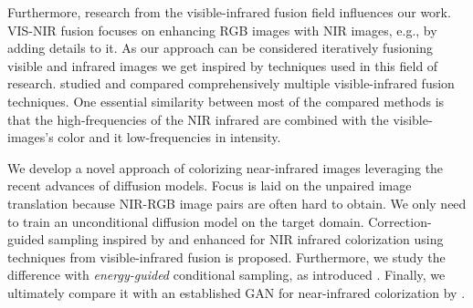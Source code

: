 Furthermore, research from the visible-infrared fusion field influences our work.
VIS-NIR fusion focuses on enhancing RGB images with NIR images, e.g., by adding details to it. 
As our approach can be considered iteratively fusioning visible and infrared images we get inspired by techniques used in this field of research.  
\textcite{study-vis-nir-fusion} studied and compared comprehensively multiple visible-infrared fusion techniques. 
One essential similarity between most of the compared methods is that the high-frequencies of the NIR infrared are combined with the visible-images's color and it low-frequencies in intensity.

We develop a novel approach of colorizing near-infrared images leveraging the recent advances of diffusion models. 
Focus is laid on the unpaired image translation because NIR-RGB image pairs are often hard to obtain. 
We only need to train an unconditional diffusion model on the target domain. 
Correction-guided sampling inspired by \textcite{ilvr} and enhanced for NIR infrared colorization using techniques from visible-infrared fusion \parencite{study-vis-nir-fusion} is proposed. 
Furthermore, we study the difference with \textit{energy-guided} conditional sampling, as introduced \textcite{egsde}. 
Finally, we ultimately compare it with an established GAN for near-infrared colorization by \textcite{mehri}. 

